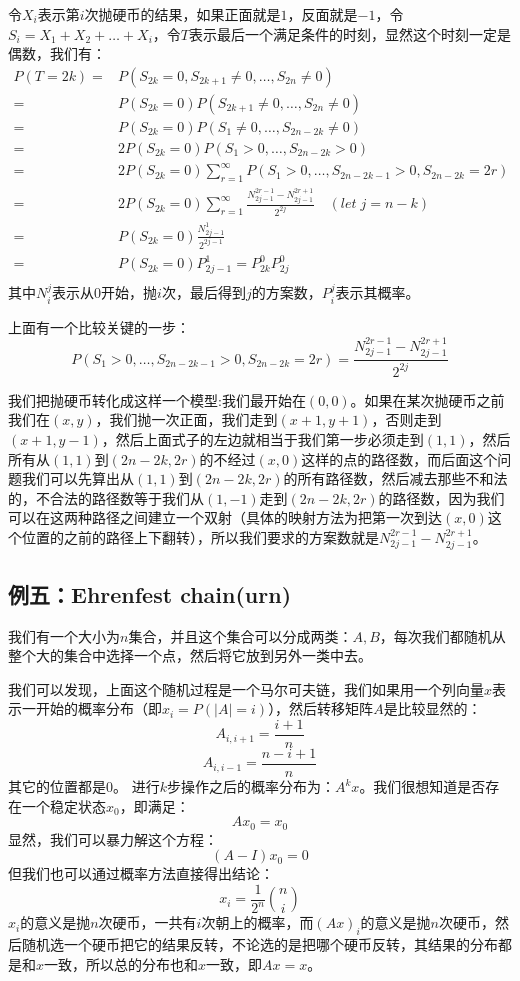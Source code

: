		\proof 令$X_i$表示第$i$次抛硬币的结果，如果正面就是$1$，反面就是$-1$，令$S_i=X_1+X_2+\dots+X_i$，令$T$表示最后一个满足条件的时刻，显然这个时刻一定是偶数，我们有：
		\[ \begin{split}
			P(T=2k) = & P(S_{2k}=0,S_{2k+1}\neq0,\dots,S_{2n}\neq0) \\
					= & P(S_{2k}=0)P(S_{2k+1}\neq0,\dots,S_{2n}\neq0) \\
					= & P(S_{2k}=0)P(S_1\neq0,\dots,S_{2n-2k}\neq0) \\
					= & 2P(S_{2k}=0)P(S_1>0,\dots,S_{2n-2k}>0) \\
					= & 2P(S_{2k}=0)\sum_{r=1}^{\infty}P(S_1>0,\dots,S_{2n-2k-1}>0,S_{2n-2k}=2r) \\
					= & 2P(S_{2k}=0)\sum_{r=1}^{\infty}\frac{N_{2j-1}^{2r-1}-N_{2j-1}^{2r+1}}{2^{2j}}	\quad (let \; j = n-k)\\
					= & P(S_{2k}=0)\frac{N_{2j-1}^{1}}{2^{2j-1}} \\
					= & P(S_{2k}=0)P_{2j-1}^{1} = P_{2k}^{0}P_{2j}^{0} \\
		\end{split}	\]
		其中$N_i^j$表示从$0$开始，抛$i$次，最后得到$j$的方案数，$P_i^j$表示其概率。
		
		上面有一个比较关键的一步：
		$$
		P(S_1>0,\dots,S_{2n-2k-1}>0,S_{2n-2k}=2r) = \frac{N_{2j-1}^{2r-1}-N_{2j-1}^{2r+1}}{2^{2j}}
		$$
		
		我们把抛硬币转化成这样一个模型:我们最开始在$(0,0)$。如果在某次抛硬币之前我们在$(x,y)$，我们抛一次正面，我们走到$(x+1,y+1)$，否则走到$(x+1,y-1)$，然后上面式子的左边就相当于我们第一步必须走到$(1,1)$，然后所有从$(1,1)$到$(2n-2k,2r)$的不经过$(x,0)$这样的点的路径数，而后面这个问题我们可以先算出从$(1,1)$到$(2n-2k,2r)$的所有路径数，然后减去那些不和法的，不合法的路径数等于我们从$(1,-1)$走到$(2n-2k,2r)$的路径数，因为我们可以在这两种路径之间建立一个双射（具体的映射方法为把第一次到达$(x,0)$这个位置的之前的路径上下翻转），所以我们要求的方案数就是$N_{2j-1}^{2r-1}-N_{2j-1}^{2r+1}$。
		
		\subsection{例五：Ehrenfest chain(urn)}
		我们有一个大小为$n$集合，并且这个集合可以分成两类：$A, B$，每次我们都随机从整个大的集合中选择一个点，然后将它放到另外一类中去。
		
		我们可以发现，上面这个随机过程是一个马尔可夫链，我们如果用一个列向量$x$表示一开始的概率分布（即$x_i = P(\lvert A\rvert=i)$），然后转移矩阵$A$是比较显然的：
		$$
			A_{i,i+1} = \frac{i+1}{n}
		$$
		$$
			A_{i,i-1} = \frac{n-i+1}{n}
		$$
		其它的位置都是$0$。
		进行$k$步操作之后的概率分布为：$A^kx$。我们很想知道是否存在一个稳定状态$x_0$，即满足：
		$$
			Ax_0 = x_0
		$$
		显然，我们可以暴力解这个方程：
		$$
			(A-I)x_0 = 0
		$$
		但我们也可以通过概率方法直接得出结论：
		$$
			x_i = \frac{1}{2^n} \binom{n}{i}
		$$
		$x_i$的意义是抛$n$次硬币，一共有$i$次朝上的概率，而$(Ax)_i$的意义是抛$n$次硬币，然后随机选一个硬币把它的结果反转，不论选的是把哪个硬币反转，其结果的分布都是和$x$一致，所以总的分布也和$x$一致，即$Ax=x$。
